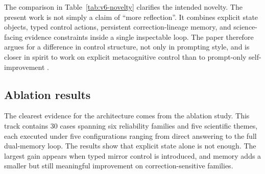 \documentclass[12pt]{article}
\begin{document}
\begin{table}[H]
\centering
{}
\caption{Positioning of Mirror Reflection Agent against closely related reflective pipelines. The intended contribution is the combined use of explicit state externalization, typed control verdicts, persistent correction lineage, abstention governance, and science-facing condition handling.}
\label{tab:v6-novelty}
\end{table}

The comparison in Table~\ref{tab:v6-novelty} clarifies the intended novelty. The present work is not simply a claim of ``more reflection''. It combines explicit state objects, typed control actions, persistent correction-lineage memory, and science-facing evidence constraints inside a single inspectable loop. The paper therefore argues for a difference in control structure, not only in prompting style, and is closer in spirit to work on explicit metacognitive control than to prompt-only self-improvement \cite{sofai,academicresponse}.

\subsection{Ablation results}

The clearest evidence for the architecture comes from the ablation study. This track contains 30 cases spanning six reliability families and five scientific themes, each executed under five configurations ranging from direct answering to the full dual-memory loop. The results show that explicit state alone is not enough. The largest gain appears when typed mirror control is introduced, and memory adds a smaller but still meaningful improvement on correction-sensitive families.
\end{document}
